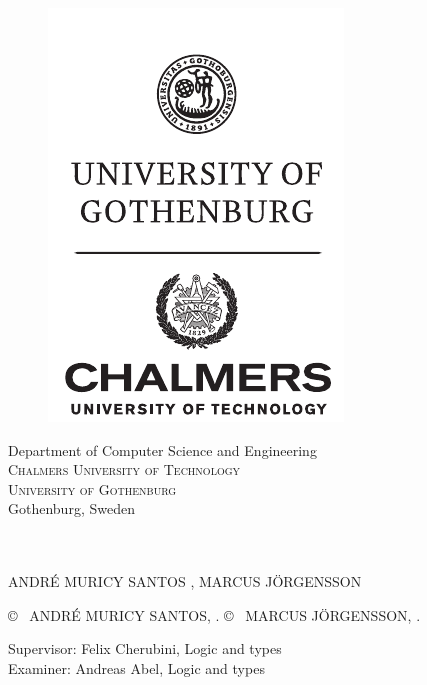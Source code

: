 {\begin{center}
	\vfill	
	\begin{figure}[H]
	\centering
	\includegraphics[width=0.25\pdfpagewidth]{figure/auxiliary/ChGULogoHog.pdf}
	\end{figure}	\vspace{5mm}	
	
	Department of Computer Science and Engineering\\
	\textsc{Chalmers University of Technology} \\
	\textsc{University of Gothenburg} \\
	Gothenburg, Sweden \the\year \\
\end{center}


\newpage
\thispagestyle{plain}
\vspace*{4.5cm}
\oneLineTitle\\
\oneLineSubtitle\\
ANDRÉ MURICY SANTOS \setlength{\parskip}{1cm},
MARCUS JÖRGENSSON \setlength{\parskip}{1cm}

\copyright ~ ANDRÉ MURICY SANTOS, \the\year. \setlength{\parskip}{1cm}
\copyright ~ MARCUS JÖRGENSSON, \the\year. \setlength{\parskip}{1cm}

Supervisor: Felix Cherubini, Logic and types\\
Examiner: Andreas Abel, Logic and types \setlength{\parskip}{1cm}

}
